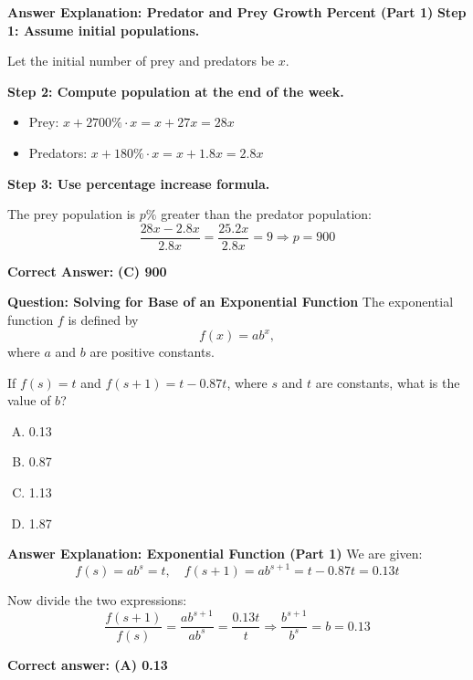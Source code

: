 \documentclass{beamer}
\begin{document}
\begin{frame}{\textbf{Answer Explanation: Predator and Prey Growth Percent (Part 1)}}
\textbf{Step 1: Assume initial populations.}

Let the initial number of prey and predators be \( x \).  
\pause

\textbf{Step 2: Compute population at the end of the week.}
\begin{itemize}
    \item Prey: \( x + 2700\% \cdot x = x + 27x = 28x \)
    \item Predators: \( x + 180\% \cdot x = x + 1.8x = 2.8x \)
\end{itemize}
\pause

\textbf{Step 3: Use percentage increase formula.}

The prey population is \( p\% \) greater than the predator population:
\[
\frac{28x - 2.8x}{2.8x} = \frac{25.2x}{2.8x} = 9
\Rightarrow p = 900
\]

\textbf{Correct Answer:} \textbf{(C) 900}
\end{frame}




\begin{frame}{\textbf{Question: Solving for Base of an Exponential Function}}
The exponential function \( f \) is defined by
\[
f(x) = ab^x,
\]
where \( a \) and \( b \) are positive constants.

If \( f(s) = t \) and \( f(s+1) = t - 0.87t \), where \( s \) and \( t \) are constants, what is the value of \( b \)?

\begin{enumerate}[A.]
    \item 0.13
    \item 0.87
    \item 1.13
    \item 1.87
\end{enumerate}
\end{frame}



\begin{frame}{\textbf{Answer Explanation: Exponential Function (Part 1)}}
We are given:
\[
f(s) = ab^s = t, \quad f(s+1) = ab^{s+1} = t - 0.87t = 0.13t
\]
\pause

Now divide the two expressions:
\[
\frac{f(s+1)}{f(s)} = \frac{ab^{s+1}}{ab^s} = \frac{0.13t}{t}
\Rightarrow \frac{b^{s+1}}{b^s} = b = 0.13
\]

\textbf{Correct answer: (A) 0.13}
\end{frame}
\end{document}
